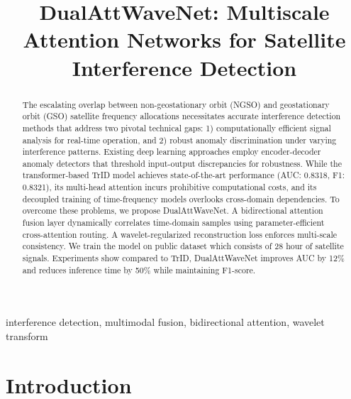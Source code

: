 \documentclass[conference]{IEEEtran}
\begin{document}
\title{DualAttWaveNet: Multiscale Attention Networks for Satellite Interference Detection}

\author{
}




\maketitle

\begin{abstract}
    The escalating overlap between non-geostationary orbit (NGSO) and geostationary orbit (GSO) satellite frequency allocations necessitates accurate interference detection methods that address two pivotal technical gaps: 1) computationally efficient  signal analysis for real-time operation, and 2) robust anomaly discrimination under varying interference patterns.  Existing deep learning approaches employ encoder-decoder anomaly detectors that threshold input-output discrepancies for robustness. While the transformer-based TrID model achieves state-of-the-art performance (AUC: 0.8318, F1: 0.8321), its multi-head attention incurs prohibitive computational costs, and its decoupled training of time-frequency models overlooks cross-domain dependencies. To overcome these problems, we propose DualAttWaveNet. A bidirectional attention fusion layer dynamically correlates time-domain samples using parameter-efficient cross-attention routing. A wavelet-regularized reconstruction loss enforces multi-scale consistency.  We train the model on public dataset which consists of 28 hour of satellite signals. Experiments show compared to TrID, DualAttWaveNet improves AUC by 12\% and reduces inference time by 50\% while maintaining F1-score. \end{abstract}

\begin{IEEEkeywords}
    interference detection, multimodal fusion, bidirectional attention, wavelet transform
\end{IEEEkeywords}

\section{Introduction}
\label{sec:intro}
\end{document}
